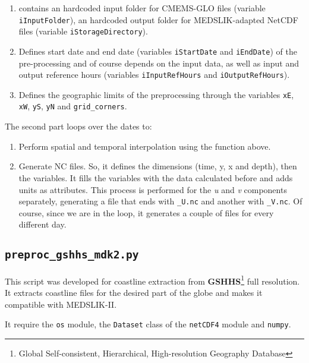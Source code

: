\begin{enumerate}
    \item contains an hardcoded input folder for CMEMS-GLO files (variable \texttt{iInputFolder}), an hardcoded output folder for MEDSLIK-adapted NetCDF files (variable \texttt{iStorageDirectory}).
    
    \item Defines start date and end date (variables \texttt{iStartDate} and \texttt{iEndDate}) of the pre-processing and of course depends on the input data, as well as input and output reference hours (variables \texttt{iInputRefHours} and \texttt{iOutputRefHours}). 
    
    \item Defines the geographic limits of the preprocessing through the variables \texttt{xE}, \texttt{xW}, \texttt{yS}, \texttt{yN} and \texttt{grid\_corners}.
    
\end{enumerate}

The second part loops over the dates to:

\begin{enumerate}
    \item Perform spatial and temporal interpolation using the function above. 
    
    \item Generate NC files. So, it defines the dimensions (time, y, x and depth), then the variables. It fills the variables with the data calculated before and adds units as attributes. This process is performed for the \textit{u} and \textit{v} components separately, generating a file that ends with \texttt{\_U.nc} and another with \texttt{\_V.nc}. Of course, since we are in the loop, it generates a couple of files for every different day.
    
\end{enumerate}

\subsection{\texttt{preproc\_gshhs\_mdk2.py}}

This script was developed for coastline extraction from \textbf{GSHHS}\footnote{Global Self-consistent, Hierarchical, High-resolution Geography Database} full resolution. It extracts coastline files for the desired part of the globe and makes it compatible with MEDSLIK-II. 

It require the \texttt{os} module, the \texttt{Dataset} class of the \texttt{netCDF4} module and \texttt{numpy}.

